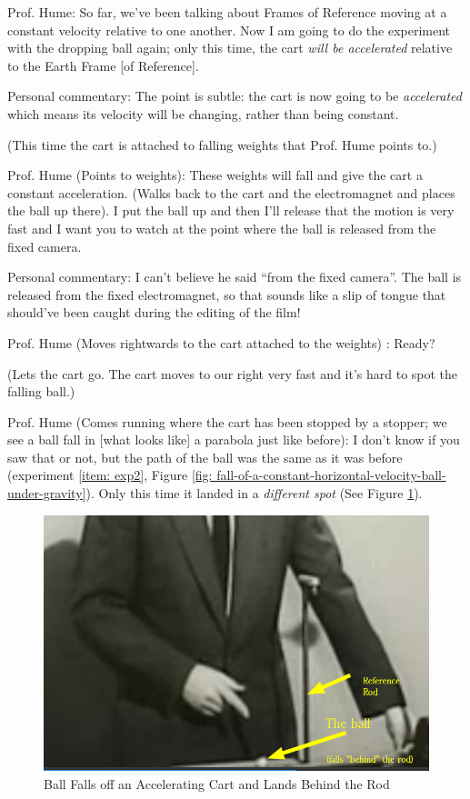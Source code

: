 \documentclass[a6paper]{article}
\begin{document}
Prof. Hume: So far, we've been talking about Frames of Reference moving at a constant velocity relative to one another. Now I am going to do the experiment with the dropping ball again; only this time, the cart \emph{will be accelerated} relative to the Earth Frame [of Reference].

Personal commentary: The point is subtle: the cart is now going to be \emph{accelerated} which means its velocity will be changing, rather than being constant.

(This time the cart is attached to falling weights that Prof. Hume points to.)

Prof. Hume (Points to weights): These weights will fall and give the cart a constant acceleration. (Walks back to the cart and the electromagnet and places the ball up there). I put the ball up and then I'll release that the motion is very fast and I want you to watch at the point where the ball is released from the fixed camera. 

Personal commentary: I can't believe he said ``from the fixed camera''. The ball is released from the fixed electromagnet, so that sounds like a slip of tongue that should've been caught during the editing of the film! 

Prof. Hume (Moves rightwards to the cart attached to the weights) : Ready? 

(Lets the cart go. The cart moves to our right very fast and it's hard to spot the falling ball.)

Prof. Hume (Comes running where the cart has been stopped by a stopper; we see a ball fall in [what looks like] a parabola just like before): I don't know if you saw that or not, but the path of the ball was the same as it was before (experiment \ref{item: exp2}, Figure \ref{fig: fall-of-a-constant-horizontal-velocity-ball-under-gravity}). Only this time it landed in a \emph{different spot} (See Figure \ref{fig: ball-falls-off-an-accelerating-cart}). 

\begin{figure}
    \centering
    \includegraphics[width=0.7\linewidth]{ball-falls-off-an-accelerating-cart.png}
    \caption{Ball Falls off an Accelerating Cart and Lands Behind the Rod}
    \label{fig: ball-falls-off-an-accelerating-cart}
\end{figure}
\end{document}
